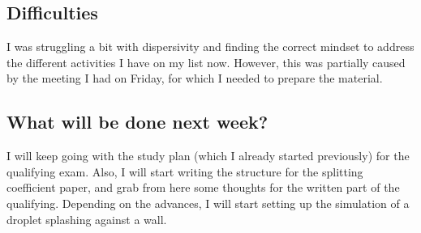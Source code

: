 \documentclass[12pt]{article}
\begin{document}
	\subsection*{Difficulties}
	I was struggling a bit with dispersivity and finding the correct mindset to address the different activities I have on my list now. However, this was partially caused by the meeting I had on Friday, for which I needed to prepare the material. 
	
	\subsection*{What will be done next week?}
	I will keep going with the study plan (which I already started previously) for the qualifying exam. Also, I will start writing the structure for the splitting coefficient paper, and grab from here some thoughts for the written part of the qualifying. Depending on the advances, I will start setting up 
	the simulation of a droplet splashing against a wall. 	
	
	\printbibliography %
\end{document}
